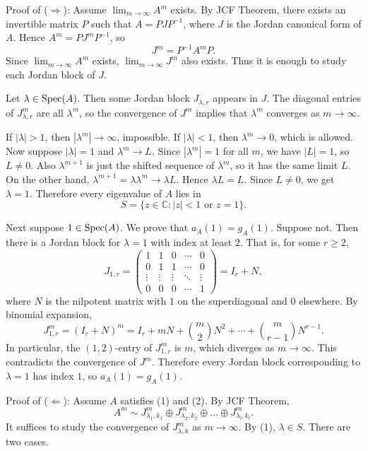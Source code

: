 \begin{pfbox}
Proof of ($\Rightarrow$): Assume $\displaystyle\lim_{m\to\infty}A^m$ exists. By JCF Theorem, there exists an invertible matrix $P$ such that $A=PJP^{-1}$, where $J$ is the Jordan canonical form of $A$. Hence $A^m=PJ^mP^{-1}$, so
\[
J^m=P^{-1}A^mP.
\]
Since $\displaystyle\lim_{m\to\infty}A^m$ exists, $\displaystyle\lim_{m\to\infty}J^m$ also exists. Thus it is enough to study each Jordan block of $J$.

Let $\lambda\in\operatorname{Spec}(A)$. Then some Jordan block $J_{\lambda,r}$ appears in $J$. The diagonal entries of $J_{\lambda,r}^m$ are all $\lambda^m$, so the convergence of $J^m$ implies that $\lambda^m$ converges as $m\to\infty$.

If $|\lambda|>1$, then $|\lambda^m|\to\infty$, impossible. If $|\lambda|<1$, then $\lambda^m\to0$, which is allowed. Now suppose $|\lambda|=1$ and $\lambda^m\to L$. Since $|\lambda^m|=1$ for all $m$, we have $|L|=1$, so $L\neq0$. Also $\lambda^{m+1}$ is just the shifted sequence of $\lambda^m$, so it has the same limit $L$. On the other hand, $\lambda^{m+1}=\lambda\lambda^m\to\lambda L$. Hence $\lambda L=L$. Since $L\neq0$, we get $\lambda=1$. Therefore every eigenvalue of $A$ lies in
\[
S=\{z\in\mathbb{C}: |z|<1 \text{ or } z=1\}.
\]

Next suppose $1\in\operatorname{Spec}(A)$. We prove that $a_A(1)=g_A(1)$. Suppose not. Then there is a Jordan block for $\lambda=1$ with index at least $2$. That is, for some $r\ge2$,
\[
J_{1,r}
=
\begin{pmatrix}
1 & 1 & 0 & \cdots & 0\\
0 & 1 & 1 & \cdots & 0\\
\vdots & \vdots & \vdots & \ddots & \vdots\\
0 & 0 & 0 & \cdots & 1
\end{pmatrix}
=I_r+N,
\]
where $N$ is the nilpotent matrix with $1$ on the superdiagonal and $0$ elsewhere. By binomial expansion,
\[
J_{1,r}^m
=(I_r+N)^m
=I_r+mN+\binom{m}{2}N^2+\cdots+\binom{m}{r-1}N^{r-1}.
\]
In particular, the $(1,2)$-entry of $J_{1,r}^m$ is $m$, which diverges as $m\to\infty$. This contradicts the convergence of $J^m$. Therefore every Jordan block corresponding to $\lambda=1$ has index $1$, so $a_A(1)=g_A(1)$.

Proof of ($\Leftarrow$): Assume $A$ satisfies (1) and (2). By JCF Theorem,
\[
A^m
\sim
J_{\lambda_1,k_1}^m
\oplus
J_{\lambda_2,k_2}^m
\oplus
\dots
\oplus
J_{\lambda_l,k_l}^m.
\]
It suffices to study the convergence of $J_{\lambda,k}^m$ as $m\to\infty$.
By (1), $\lambda\in S$. There are two cases.


\end{pfbox}
